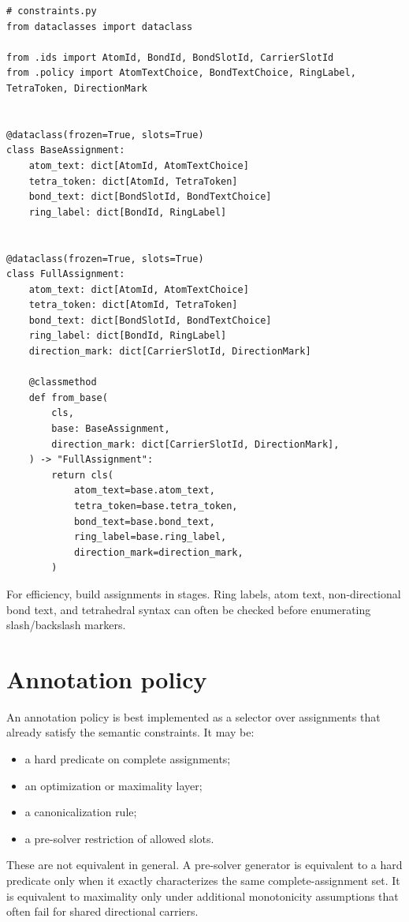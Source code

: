 \documentclass[10pt,a4paper]{article}
\theoremstyle{definition}
\theoremstyle{remark}
\begin{document}
\begin{lstlisting}
# constraints.py
from dataclasses import dataclass

from .ids import AtomId, BondId, BondSlotId, CarrierSlotId
from .policy import AtomTextChoice, BondTextChoice, RingLabel, TetraToken, DirectionMark


@dataclass(frozen=True, slots=True)
class BaseAssignment:
    atom_text: dict[AtomId, AtomTextChoice]
    tetra_token: dict[AtomId, TetraToken]
    bond_text: dict[BondSlotId, BondTextChoice]
    ring_label: dict[BondId, RingLabel]


@dataclass(frozen=True, slots=True)
class FullAssignment:
    atom_text: dict[AtomId, AtomTextChoice]
    tetra_token: dict[AtomId, TetraToken]
    bond_text: dict[BondSlotId, BondTextChoice]
    ring_label: dict[BondId, RingLabel]
    direction_mark: dict[CarrierSlotId, DirectionMark]

    @classmethod
    def from_base(
        cls,
        base: BaseAssignment,
        direction_mark: dict[CarrierSlotId, DirectionMark],
    ) -> "FullAssignment":
        return cls(
            atom_text=base.atom_text,
            tetra_token=base.tetra_token,
            bond_text=base.bond_text,
            ring_label=base.ring_label,
            direction_mark=direction_mark,
        )
\end{lstlisting}

For efficiency, build assignments in stages.  Ring labels, atom text,
non-directional bond text, and tetrahedral syntax can often be checked before
enumerating slash/backslash markers.

\section{Annotation policy}
\label{s:annotation}

An annotation policy is best implemented as a selector over assignments that
already satisfy the semantic constraints.  It may be:
\begin{itemize}[leftmargin=*]
\item a hard predicate on complete assignments;
\item an optimization or maximality layer;
\item a canonicalization rule;
\item a pre-solver restriction of allowed slots.
\end{itemize}
These are not equivalent in general.  A pre-solver generator is equivalent to a
hard predicate only when it exactly characterizes the same complete-assignment
set.  It is equivalent to maximality only under additional monotonicity
assumptions that often fail for shared directional carriers.
\end{document}
